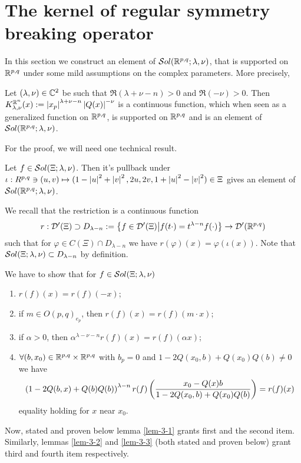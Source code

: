 \documentclass[10pt]{article} %
\newcommand{\D}{\mathcal{D}}
\theoremstyle{definition}
\theoremstyle{remark}
\begin{document}
\section{The kernel of regular symmetry breaking operator}
In this section we construct an element of $\sol$, that is supported on $\R^{ p,q }$ under some mild
assumptions on the complex parameters. More precisely,
\begin{myprop}\label{prop-regular}
	Let $(\lambda,\nu)\in\C^2$ be such that $\Re(\lambda+\nu-n)>0$ and $\Re(-\nu)>0$. Then
	$K_{ \lambda,\nu }^{ \R^n }(x):=\myabs{ x_p}^{ \lambda+\nu-n }\myabs{ Q(x) }^{ -\nu }$ is a continuous function,
	which when seen as a generalized function on $\R^{ p,q }$, is supported on $\R^{ p,q }$ and is an element of $\sol$.
\end{myprop}
For the proof, we will need one technical result.
\begin{mylem}\label{lem-3}
	Let $f\in \solXi$. Then it's pullback under $\iota:R^{p,q}\ni(u,v)\mapsto
	(1-\myabs{ u }^2+\myabs{ v }^2,2u,2v,1+\myabs{ u }^2-\myabs{ v }^2)\in\Xi$ gives an element of $\sol$.
\end{mylem}
\begin{myproof}
	We recall that the restriction is a continuous function 
	\[r:\D'(\Xi)\supset D_{\lambda-n}:=\mysetn{f\in\D'(\Xi)}{f(t\cdot)=t^{\lambda-n}f(\cdot)}\to\D'(\R^{p,q})\]
	such that for $\varphi\in C(\Xi)\cap D_{\lambda-n}$ we have $r(\varphi)(x)=\varphi(\iota(x))$.
	Note that $\solXi\subset D_{\lambda-n}$ by definition.
	
	We have to show that for $f\in\sol[\Xi]$
	\begin{enumerate}
		\item $r(f)(x)=r(f)(-x)$;
		\item if $m\in O(p,q)_{e_p}$, then $r(f)(x)=r(f)(m\cdot x)$;
		\item if $\alpha>0$, then $\alpha^{\lambda-\nu-n}r(f)(x)=r(f)(\alpha x)$;
		\item $\forall (b,x_0)\in\R^{ p,q }\times\R^{p,q}$ with $b_p=0$ and
				${ 1-2Q(x_0,b)+Q(x_0)Q(b) }\neq0$
				we have \[\mybra{ 1-2Q(b,x)+Q(b)Q(b) }^{ \lambda-n }r(f)
				\mybra{\frac{ x_0-Q(x)b }{ 1-2Q(x_0,b)+Q(x_0)Q(b)}}=r(f)(x)\] equality holding for $x$ near $x_0$.
	\end{enumerate}
	Now, stated and proven below lemma \ref{lem-3-1} grants first and the second item. Similarly, lemmas \ref{lem-3-2} 
	and \ref{lem-3-3} (both stated and proven below) grant third and fourth item respectively.
\end{myproof}
\end{document}
